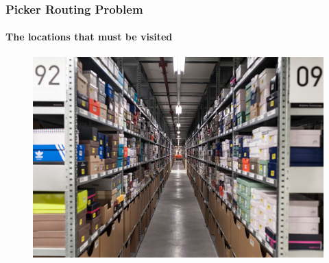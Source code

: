 \documentclass[english,a4,aspectratio=169]{beamer}
\begin{document}

\begin{frame}
\frametitle{Picker Routing Problem}
\framesubtitle{The locations that must be visited}
 \begin{figure}
  \centering
  \includegraphics[width=.65\textwidth]{../figures/retail_3_gross.png}
 \end{figure}
\end{frame}
\end{document}
